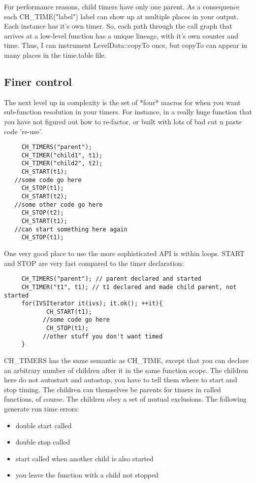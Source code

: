     
      For performance reasons, child timers have only one parent.  As a consequence
      each CH\_TIME("label") label can show up at multiple places in your output. Each
      instance has it's own timer.  So, each path through the call graph that arrives
      at a low-level function has a unique lineage, with it's own counter and time.
      Thus, I can instrument LevelData::copyTo once, but copyTo can appear in many
      places in the time.table file. 

\subsection{Finer control} 
     The next level up in complexity is the set of *four* macros for when you want
     sub-function resolution in your timers. For instance, in a really huge function
     that you have not figured out how to re-factor, or built with lots of bad cut n paste
     code 're-use'. 

\begin{verbatim}
     CH_TIMERS("parent");
     CH_TIMER("child1", t1);
     CH_TIMER("child2", t2);
     CH_START(t1);
   //some code go here
     CH_STOP(t1);
     CH_START(t2);
   //some other code go here
     CH_STOP(t2);
     CH_START(t1);
   //can start something here again
     CH_STOP(t1);
\end{verbatim}

  One very good place to use the more sophisticated API is within loops.  START and STOP are
very fast compared to the timer declaration:

\begin{verbatim}
     CH_TIMERS("parent"); // parent declared and started
     CH_TIMER("t1", t1); // t1 declared and made child parent, not started
     for(IVSIterator it(ivs); it.ok(); ++it){
            CH_START(t1);
           //some code go here
            CH_STOP(t1);
           //other stuff you don't want timed
     }
\end{verbatim}



     CH\_TIMERS has the same semantic as CH\_TIME, except that you can declare an 
     arbitrary number of children after it in the same function scope.  The 
     children here do not autostart and autostop, you have to tell them where to
     start and stop timing.  The children can themselves be parents for timers 
     in called functions, of course. The children obey a set of mutual exclusions. The
     following generate run time errors:
\begin{itemize}
     \item double start called
     \item double stop called
     \item start called when another child is also started
     \item you leave the function with a child not stopped
\end{itemize}


